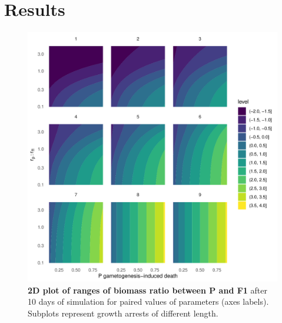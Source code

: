 \documentclass[a4paper,oneside]{book}
\begin{document}
  \section*{Results}
    \begin{figure}
      \includegraphics[width=\linewidth]{imgs/a.pdf}
      \caption{\textbf{2D plot of ranges of biomass ratio between P and F1} after 10 days of simulation for paired values of parameters (axes labels). Subplots represent growth arrests of different length.}\label{gon1}
    \end{figure}
\end{document}
